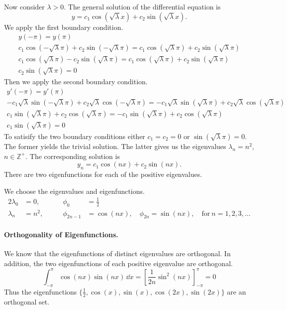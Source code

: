 Now consider $\lambda > 0$.
The general solution of the differential equation is
\[ 
y = c_1 \cos \left( \sqrt{\lambda} x \right) + c_2 \sin \left( \sqrt{\lambda} x \right).
\]
We apply the first boundary condition.
\begin{gather*}
  y(-\pi) = y(\pi) 
  \\
  c_1 \cos \left(-\sqrt{\lambda}\pi \right) + c_2 \sin \left(-\sqrt{\lambda}\pi \right) 
  = c_1 \cos \left(\sqrt{\lambda}\pi \right) + c_2 \sin \left(\sqrt{\lambda}\pi \right) 
  \\
  c_1 \cos \left(\sqrt{\lambda}\pi \right) - c_2 \sin \left(\sqrt{\lambda}\pi \right) 
  = c_1 \cos \left(\sqrt{\lambda}\pi \right) + c_2 \sin \left(\sqrt{\lambda}\pi \right) 
  \\
  c_2 \sin \left(\sqrt{\lambda}\pi \right) = 0
\end{gather*}
Then we apply the second boundary condition.
\begin{gather*}
  y'(-\pi) = y'(\pi) 
  \\
  - c_1 \sqrt{\lambda} \sin \left(-\sqrt{\lambda}\pi \right) 
  + c_2 \sqrt{\lambda} \cos \left(-\sqrt{\lambda}\pi \right) 
  = - c_1 \sqrt{\lambda} \sin \left(\sqrt{\lambda}\pi \right) 
  + c_2 \sqrt{\lambda} \cos \left(\sqrt{\lambda}\pi \right) 
  \\
  c_1 \sin \left(\sqrt{\lambda}\pi \right) 
  + c_2 \cos \left(\sqrt{\lambda}\pi \right) 
  = - c_1 \sin \left(\sqrt{\lambda}\pi \right) 
  + c_2 \cos \left(\sqrt{\lambda}\pi \right) 
  \\
  c_1 \sin \left( \sqrt{\lambda}\pi \right) = 0
\end{gather*}
To satisify the two boundary conditions either $c_1 = c_2 = 0$ or 
$\sin \left( \sqrt{\lambda}\pi \right) = 0$.  The former yields the trivial solution.
The latter gives us the eigenvalues $\lambda_n = n^2$, $n \in \mathbb{Z}^+$.
The corresponding solution is 
\[
y_n = c_1 \cos(n x) + c_2 \sin(n x).
\]
There are two eigenfunctions for each of the positive eigenvalues.

We choose the eigenvalues and eigenfunctions.
\begin{alignat*}{2}
  \lambda_0 &= 0, &\qquad \phi_0 &= \frac{1}{2} 
  \\
  \lambda_n &= n^2, &\qquad \phi_{2n-1} &= \cos(n x), \quad 
  \phi_{2n} = \sin(n x), \quad \mathrm{for}\ n = 1, 2, 3, \ldots
\end{alignat*}


\paragraph{Orthogonality of Eigenfunctions.}
We know that the eigenfunctions of distinct eigenvalues are orthogonal.
In addition, the two eigenfunctions of each positive eigenvalue are 
orthogonal.
\[
\int_{-\pi}^\pi \cos(n x) \sin(n x) \,\dd x
= \left[ \frac{1}{2 n} \sin^2(n x) \right]_{-\pi}^\pi 
= 0
\]
Thus the eigenfunctions 
$\{ \frac{1}{2}, \cos(x), \sin(x), \cos(2 x), \sin(2 x) \}$ are an orthogonal
set.








